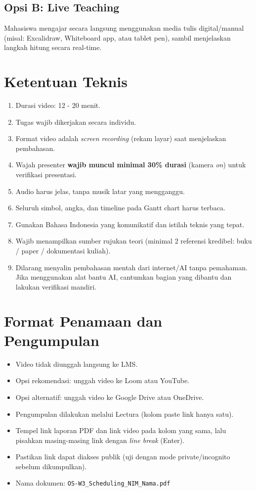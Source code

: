 \documentclass[12pt,a4paper]{article}
\begin{document}
\subsection*{Opsi B: Live Teaching}
Mahasiswa mengajar secara langsung menggunakan media tulis digital/manual (misal: Excalidraw, Whiteboard app, atau tablet pen), sambil menjelaskan langkah hitung secara real-time.

\section{Ketentuan Teknis}
\begin{enumerate}
    \item Durasi video: 12 - 20 menit.
    \item Tugas wajib dikerjakan secara individu.
    \item Format video adalah \textit{screen recording} (rekam layar) saat menjelaskan pembahasan.
    \item Wajah presenter \textbf{wajib muncul minimal 30\% durasi} (kamera \textit{on}) untuk verifikasi presentasi.
    \item Audio harus jelas, tanpa musik latar yang mengganggu.
    \item Seluruh simbol, angka, dan timeline pada Gantt chart harus terbaca.
    \item Gunakan Bahasa Indonesia yang komunikatif dan istilah teknis yang tepat.
    \item Wajib menampilkan sumber rujukan teori (minimal 2 referensi kredibel: buku / paper / dokumentasi kuliah).
    \item Dilarang menyalin pembahasan mentah dari internet/AI tanpa pemahaman. Jika menggunakan alat bantu AI, cantumkan bagian yang dibantu dan lakukan verifikasi mandiri.
\end{enumerate}

\section{Format Penamaan dan Pengumpulan}
\begin{itemize}
    \item Video tidak diunggah langsung ke LMS.
    \item Opsi rekomendasi: unggah video ke Loom atau YouTube.
    \item Opsi alternatif: unggah video ke Google Drive atau OneDrive.
    \item Pengumpulan dilakukan melalui Lectura (kolom paste link hanya satu).
    \item Tempel link laporan PDF dan link video pada kolom yang sama, lalu pisahkan masing-masing link dengan \textit{line break} (Enter).
    \item Pastikan link dapat diakses publik (uji dengan mode private/incognito sebelum dikumpulkan).
    \item Nama dokumen: \texttt{OS-W3\_Scheduling\_NIM\_Nama.pdf}
\end{itemize}
\end{document}
